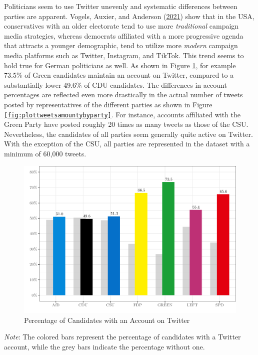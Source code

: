 \documentclass[a4paper,11pt]{article}
\begin{document}
Politicians seem to use Twitter unevenly and systematic differences between parties are apparent. Vogels, Auxier, and Anderson (\protect\hyperlink{ref-vogelsPartisanDifferencesSocial2021}{2021}) show that in the USA, conservatives with an older electorate tend to use more \emph{traditional} campaign media strategies, whereas democrats affiliated with a more progressive agenda that attracts a younger demographic, tend to utilize more \emph{modern} campaign media platforms such as Twitter, Instagram, and TikTok. This trend seems to hold true for German politicians as well. As shown in Figure \texttt{\ref{fig:plotpercentageaccount}},
for example 73.5\% of Green candidates maintain an account on Twitter, compared to a substantially lower 49.6\% of CDU candidates. The differences in account percentages are reflected even more drastically in the actual number of tweets posted by representatives of the different parties as shown in Figure \texttt{\ref{fig:plottweetsamountybyparty}}. For instance, accounts affiliated with the Green Party have posted roughly 20 times as many tweets as those of the CSU. Nevertheless, the candidates of all parties seem generally quite active on Twitter. With the exception of the CSU, all parties are represented in the dataset with a minimum of 60,000 tweets.
\begin{figure}[H]

\includegraphics[width=0.95\linewidth]{thesis_files/figure-latex/plotpercentageaccount-1} \hfill{}

\caption{Percentage of Candidates with an Account on Twitter}\label{fig:plotpercentageaccount}
\end{figure}
\vspace{-1cm}
\begin{center}
    \begin{minipage}{0.95\linewidth}
    \scriptsize
    \textit{Note}: The colored bars represent the percentage of candidates with a Twitter account, while the grey bars indicate the percentage without one.
    \end{minipage}
\end{center}
\end{document}

